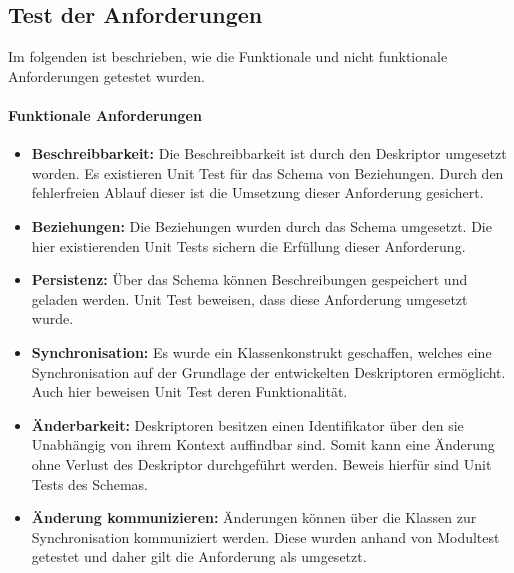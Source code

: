 \documentclass[a4paper]{article}
\begin{document}
	\subsection{Test der Anforderungen }
	Im folgenden ist beschrieben, wie die Funktionale und nicht funktionale
	Anforderungen getestet wurden.
	
	\paragraph{Funktionale Anforderungen}
	\begin{itemize}
		\item \textbf{Beschreibbarkeit:} Die Beschreibbarkeit ist durch den
		Deskriptor umgesetzt worden. Es existieren Unit Test für das Schema
		von Beziehungen. Durch den fehlerfreien Ablauf dieser ist die
		Umsetzung dieser Anforderung gesichert.
		\newpage
		\item \textbf{Beziehungen:} Die Beziehungen wurden durch das Schema
		umgesetzt. Die hier existierenden Unit Tests sichern die Erfüllung
		dieser Anforderung.
		\item \textbf{Persistenz:} Über das Schema können Beschreibungen gespeichert
		und geladen werden. Unit Test beweisen, dass diese Anforderung umgesetzt
		wurde.
		\item \textbf{Synchronisation:} Es wurde ein Klassenkonstrukt geschaffen,
		welches eine Synchronisation auf der Grundlage der entwickelten Deskriptoren
		ermöglicht. Auch hier beweisen Unit Test deren Funktionalität.
		\item \textbf{Änderbarkeit:} Deskriptoren besitzen einen Identifikator über
		den sie Unabhängig von ihrem Kontext auffindbar sind. Somit kann
		eine Änderung ohne Verlust des Deskriptor durchgeführt werden. Beweis hierfür
		sind Unit Tests des Schemas.
		\item \textbf{Änderung kommunizieren:} Änderungen können über die
		Klassen zur Synchronisation kommuniziert werden. Diese wurden anhand
		von Modultest getestet und daher gilt die Anforderung als umgesetzt.
	\end{itemize} 	
	
\end{document}
